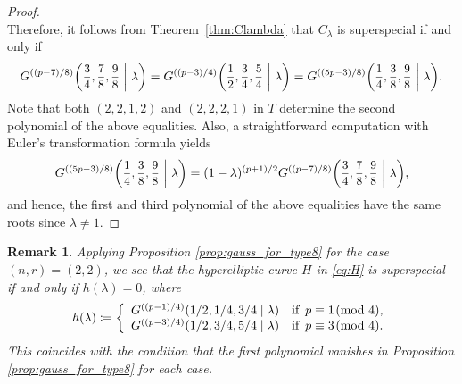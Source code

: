 \documentclass[10pt,a4paper]{amsart}
\newtheorem{Rmk}[Def]{Remark}
\begin{document}
\begin{proof}
\[\]
Therefore, it follows from Theorem~\ref{thm:Clambda} that $C_\lambda$ is superspecial if and only if\vspace{-1.4mm}
\[
    G^{((p-7)/8)}\scalebox{0.95}{$\displaystyle\left(\frac{3}{4},\frac{7}{8},\frac{9}{8}\ \middle|\ \lambda\right)$} = G^{((p-3)/4)}\scalebox{0.95}{$\displaystyle\left(\frac{1}{2},\frac{3}{4},\frac{5}{4}\ \middle|\ \lambda\right)$} = G^{((5p-3)/8)}\scalebox{0.95}{$\displaystyle\left(\frac{1}{4},\frac{3}{8},\frac{9}{8}\ \middle|\ \lambda\right)$}.\vspace{-1mm}
\]
Note that both $(2,2,1,2)$ and $(2,2,2,1)$ in $T$ determine the second polynomial of the above equalities.
Also, a straightforward computation with Euler's transformation formula yields\vspace{-1.3mm}
\[
    G^{((5p-3)/8)}\scalebox{0.95}{$\displaystyle\left(\frac{1}{4},\frac{3}{8},\frac{9}{8}\ \middle|\ \lambda\right)$} = (1-\lambda)^{(p+1)/2}G^{((p-7)/8)}\scalebox{0.95}{$\displaystyle\left(\frac{3}{4},\frac{7}{8},\frac{9}{8}\ \middle|\ \lambda\right)$},\vspace{-1.1mm}
\]
and hence, the first and third polynomial of the above equalities have the same roots since $\lambda \neq 1$.\vspace{-1.8mm}
\end{proof}
\begin{Rmk}
Applying Proposition \ref{prop:gauss_for_type8} for the case $(n,r) = (2,2)$, we see that the hyperelliptic curve $H$ in \eqref{eq:H} is superspecial if and only if $h(\lambda)=0$, where\vspace{-1mm}
\begin{equation}\label{eq:h}
    h(\lambda) \coloneqq \left\{
        \begin{array}{ll}
            G^{((p-1)/4)}(1/2,1/4,3/4 \mid \lambda) & \text{if }\, p \equiv 1 \!\!\pmod{4},\\
            G^{((p-3)/4)}(1/2,3/4,5/4 \mid \lambda) & \text{if }\, p \equiv 3 \!\!\pmod{4}.
        \end{array}
    \right.\vspace{-0.7mm}
\end{equation}
This coincides with the condition that the first polynomial vanishes in Proposition \ref{prop:gauss_for_type8} for each case.
\end{Rmk}
\end{document}
